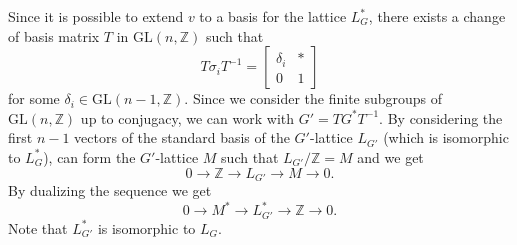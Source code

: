 \documentclass[12pt]{article}
\theoremstyle{plain}
\theoremstyle{definition}
\newcommand{\Z}{\ensuremath{\mathbb{Z}}}
\begin{document}
Since it is possible to extend $v$ to a basis for the lattice $L^*_G$, there exists a change of basis matrix $T$ in $\mathrm{GL}(n,\Z)$ such that
$$T \sigma_i T^{-1} = \left[ \begin{array}{c|c}
\delta_i & \ast\\
\hline 0 & 1
\end{array} \right]
$$ 
for some $\delta_i \in \mathrm{GL}(n-1,\Z).$ Since we consider the finite subgroups of $\mathrm{GL}(n,\Z)$ up to conjugacy, we can work with $G' = TG^*T^{-1}$. By considering the first $n-1$ vectors of the standard basis of the $G'$-lattice $L_{G'}$ (which is isomorphic to $L^*_G$), can form the $G'$-lattice $M$ such that $L_{G'}/\Z = M$ and we get 
$$0 \longrightarrow \Z \longrightarrow L_{G'} \longrightarrow M \longrightarrow 0.$$
By dualizing the sequence we get  $$0 \longrightarrow M^* \longrightarrow L^*_{G'} \longrightarrow \Z \longrightarrow 0.$$
Note that $L^*_{G'}$ is isomorphic to $L_G$.
\end{document}

